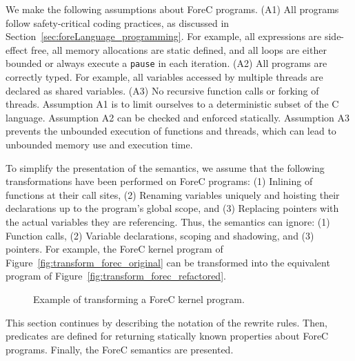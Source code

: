 We make the following assumptions about ForeC programs. 
(A1) All programs follow safety-critical coding practices,
as discussed in Section~\ref{sec:foreLanguage_programming}.
For example, all expressions are side-effect free, 
all memory allocations are static defined, and all loops are 
either bounded or always execute a \verb$pause$ in each iteration.
(A2) All programs are correctly typed. For example, all 
variables accessed by multiple threads are declared 
as shared variables. 
(A3) No recursive function calls or forking of threads.
Assumption A1 is to limit ourselves to a deterministic 
subset of the C language. Assumption A2 can be checked
and enforced statically. Assumption A3 prevents the unbounded 
execution of functions and threads, which can lead to unbounded 
memory use and execution time.

To simplify the presentation of the semantics, we 
assume that the following transformations have been performed on 
ForeC programs: (1) Inlining of functions at their call sites, 
(2) Renaming variables uniquely and hoisting their declarations 
up to the program's global scope, and (3) Replacing pointers 
with the actual variables they are referencing. 
Thus, the semantics can ignore: (1) Function calls, (2) Variable 
declarations, scoping and shadowing, and (3) pointers.
For example, the ForeC kernel program of 
Figure~\ref{fig:transform_forec_original} can be
transformed into the equivalent program of 
Figure~\ref{fig:transform_forec_refactored}.

\begin{figure}
	\hfill
	
	\caption{Example of transforming a ForeC kernel program.}
	\label{fig:transform_forec}
\end{figure}

This section continues by describing the notation of the 
rewrite rules. Then, predicates are defined for returning 
statically known properties about ForeC programs. 
Finally, the ForeC semantics are presented.


